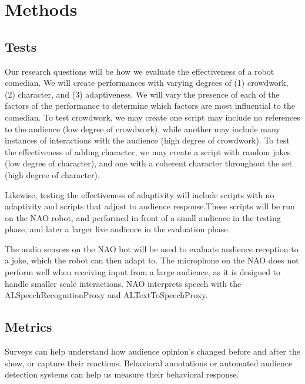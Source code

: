 \documentclass[onecolumn, draftclsnofoot,10pt, compsoc]{IEEEtran}
\begin{document}
\section{Methods}

\subsection{Tests}

Our research questions will be how we evaluate the effectiveness of a robot comedian.
We will create performances with varying degrees of (1) crowdwork, (2) character, and (3) adaptiveness. We will vary the presence of each of the factors of the performance to determine which factors are most influential to the comedian.
To test crowdwork, we may create one script may include no references to the audience (low degree of crowdwork), while another may include many instances of interactions with the audience (high degree of crowdwork).
To test the effectiveness of adding character, we may create a script with random jokes (low degree of character), and one with a coherent character throughout the set (high degree of character).


Likewise, testing the effectiveness of adaptivity will include scripts with no adaptivity and scripts that adjust to audience response.These scripts will be run on the NAO robot, and performed in front of a small audience in the testing phase, and later a larger live audience in the evaluation phase.

The audio sensors on the NAO bot will be used to evaluate audience reception to a joke, which the robot can then adapt to. The microphone on the NAO does not perform well when receiving input from a large audience, as it is designed to handle smaller scale interactions. NAO interprets speech with the ALSpeechRecognitionProxy and ALTextToSpeechProxy. 


\subsection{Metrics}

Surveys can help understand how audience opinion's changed before and after the show, or capture their reactions. Behavioral annotations or automated audience detection systems can help us measure their behavioral response.
\end{document}
